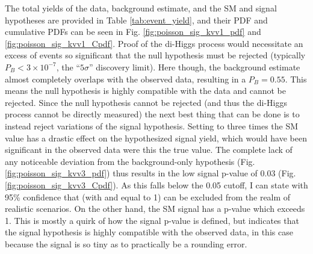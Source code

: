     The total yields of the data, background estimate, and the SM and  signal hypotheses are provided in Table \ref{tab:event_yield},
        and their PDF and cumulative PDFs can be seen in Fig. \ref{fig:poisson_sig_kvv1_pdf} and \ref{fig:poisson_sig_kvv1_Cpdf}.
    Proof of the di-Higgs process would necessitate an excess of events so significant that
        the null hypothesis must be rejected (typically $P_B < 3\times10^{-7}$, the ``$5\sigma$'' discovery limit).
    Here though, the background estimate almost completely overlaps with the observed data,
        resulting in a $P_B = 0.55$.
    This means the null hypothesis is highly compatible with the data and cannot be rejected.
    Since the null hypothesis cannot be rejected (and thus the di-Higgs process cannot be directly measured)
        the next best thing that can be done is to instead reject variations of the signal hypothesis.
    Setting \kvv to three times the SM value has a drastic effect on the hypothesized signal yield,
        which would have been significant in the observed data were this the true value.
    The complete lack of any noticeable deviation from the background-only hypothesis (Fig. \ref{fig:poisson_sig_kvv3_pdf})
        thus results in the low signal p-value of 0.03 (Fig. \ref{fig:poisson_sig_kvv3_Cpdf}).
    As this falls below the 0.05 cutoff, I can state with 95\% confidence that  (with \kl and \kv equal to 1)
        can be excluded from the realm of realistic scenarios.
    On the other hand, the SM signal has a p-value which exceeds 1.
    This is mostly a quirk of how the signal p-value is defined,
        but indicates that the signal hypothesis is highly compatible with the observed data,
        in this case because the signal is so tiny as to practically be a rounding error.


